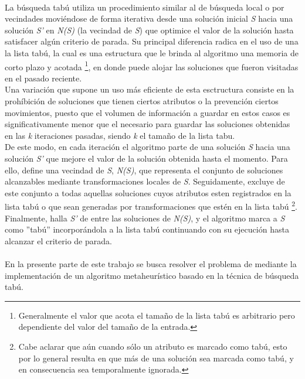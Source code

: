 \paragraph{}
La búsqueda tabú utiliza un procedimiento similar al de búsqueda local o por vecindades moviéndose de forma iterativa desde una solución inicial \textit{S} hacia una solución \textit{S'} en \textit{N(S)} (la vecindad de \textit{S}) que optimice el valor de la solución hasta satisfacer algún criterio de parada.
Su principal diferencia radica en el uso de una la lista tabú, la cual es una estructura que le brinda al algoritmo una memoria de corto plazo y acotada \footnote{Generalmente el valor que acota el tamaño de la lista tabú es arbitrario pero dependiente del valor del tamaño de la entrada.}, en donde puede alojar las soluciones que fueron visitadas en el pasado reciente. \\
Una variación que supone un uso más eficiente de esta esctructura consiste en la prohíbición de soluciones que tienen ciertos atributos o la prevención ciertos movimientos, puesto que el volumen de información a guardar en estos casos es significativamente menor que el necesario para guardar las soluciones obtenidas en las \textit{k} iteraciones pasadas, siendo \textit{k} el tamaño de la lista tabu. \\
De este modo, en cada iteración el algoritmo parte de una solución \textit{S} hacia una solución \textit{S'} que mejore el valor de la solución obtenida hasta el momento. Para ello, define una vecindad de \textit{S}, \textit{N(S)}, que representa el conjunto de soluciones alcanzables mediante transformaciones locales de \textit{S}. Seguidamente, excluye de este conjunto a todas aquellas soluciones cuyos atributos esten registrados en la lista tabú o que sean generadas por transformaciones que estén en la lista tabú \footnote{Cabe aclarar que aún cuando sólo un atributo es marcado como tabú, esto por lo general resulta en que más de una solución sea marcada como tabú, y en consecuencia sea temporalmente ignorada.}. Finalmente, halla \textit{S'} de entre las soluciones de \textit{N(S)}, y el algoritmo marca a \textit{S} como ''tabú'' incorporándola a la lista tabú continuando con su ejecución hasta alcanzar el criterio de parada.

\paragraph{}
En la presente parte de este trabajo se busca resolver el problema de \mc mediante la implementación de un algoritmo metaheurístico basado en la técnica de búsqueda tabú.


